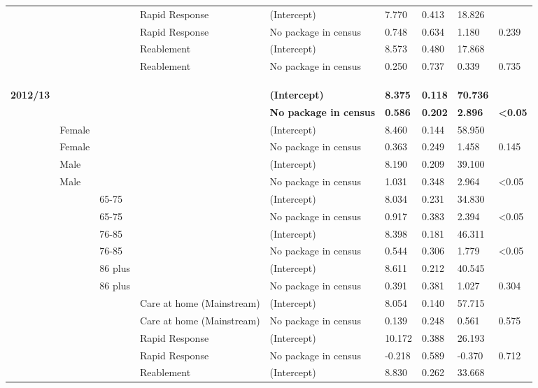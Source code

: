 \documentclass[]{article}
\begin{document}
\begin{landscape}
\begin{longtable}[c]{@{}lllllllll@{}}
 &  &  & Rapid Response & (Intercept) & 7.770 & 0.413 & 18.826 &  \\
 &  &  & Rapid Response & No package in census & 0.748 & 0.634 & 1.180 & 0.239 \\
 &  &  & Reablement & (Intercept) & 8.573 & 0.480 & 17.868 &  \\
 &  &  & Reablement & No package in census & 0.250 & 0.737 & 0.339 & 0.735 \\
 \\
 \\
 \\
\textbf{2012/13} & \textbf{} & \textbf{} & \textbf{} & \textbf{(Intercept)} & \textbf{8.375} & \textbf{0.118} & \textbf{70.736} & \textbf{} \\
\textbf{} & \textbf{} & \textbf{} & \textbf{} & \textbf{No package in census} & \textbf{0.586} & \textbf{0.202} & \textbf{2.896} & \textbf{\textless{}0.05} \\
 & Female &  &  & (Intercept) & 8.460 & 0.144 & 58.950 &  \\
 & Female &  &  & No package in census & 0.363 & 0.249 & 1.458 & 0.145 \\
 & Male &  &  & (Intercept) & 8.190 & 0.209 & 39.100 &  \\
 & Male &  &  & No package in census & 1.031 & 0.348 & 2.964 & \textless{}0.05 \\
 &  & 65-75 &  & (Intercept) & 8.034 & 0.231 & 34.830 &  \\
 &  & 65-75 &  & No package in census & 0.917 & 0.383 & 2.394 & \textless{}0.05 \\
 &  & 76-85 &  & (Intercept) & 8.398 & 0.181 & 46.311 &  \\
 &  & 76-85 &  & No package in census & 0.544 & 0.306 & 1.779 & \textless{}0.05 \\
 &  & 86 plus &  & (Intercept) & 8.611 & 0.212 & 40.545 &  \\
 &  & 86 plus &  & No package in census & 0.391 & 0.381 & 1.027 & 0.304 \\
 &  &  & Care at home (Mainstream) & (Intercept) & 8.054 & 0.140 & 57.715 &  \\
 &  &  & Care at home (Mainstream) & No package in census & 0.139 & 0.248 & 0.561 & 0.575 \\
 &  &  & Rapid Response & (Intercept) & 10.172 & 0.388 & 26.193 &  \\
 &  &  & Rapid Response & No package in census & -0.218 & 0.589 & -0.370 & 0.712 \\
 &  &  & Reablement & (Intercept) & 8.830 & 0.262 & 33.668 &  \\

\end{longtable}
\end{landscape}
\end{document}
